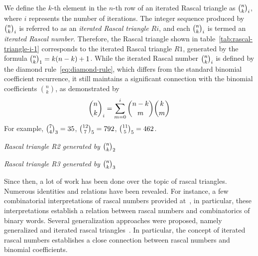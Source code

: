 We define the $k$-th element in the $n$-th row of an iterated Rascal triangle as $\binom{n}{k}_{i}$,
where $i$ represents the number of iterations.
The integer sequence produced by $\binom{n}{k}_{i}$ is referred to as an \textit{iterated Rascal triangle $Ri$},
and each $\binom{n}{k}_{i}$ is termed an \textit{iterated Rascal number}.
Therefore, the Rascal triangle shown in table~\eqref{tab:rascal-triangle-i-1} corresponds
to the iterated Rascal triangle $R1$, generated by the formula $\binom{n}{k}_{1} = k(n-k)+1$.
While the iterated Rascal number $\binom{n}{k}_{i}$ is defined by the diamond rule~\eqref{eq:diamond-rule},
which differs from the standard binomial coefficient recurrence,
it still maintains a significant connection with the binomial coefficients $\binom{n}{k}$,
as demonstrated by
\begin{equation}
    \binom{n}{k}_{i} = \sum_{m=0}^{i} \binom{n-k}{m} \binom{k}{m}
    \label{eq:iterated-rascal-number}
\end{equation}
For example, $\binom{7}{4}_{3}=35$, $\binom{12}{7}_{5}=792$, $\binom{11}{5}_{5}=462$.
\begin{examp}
    \emph{
        Rascal triangle R2 generated by $\binom{n}{k}_{2}$
        }
\end{examp}
\begin{examp}
    \emph{
        Rascal triangle R3 generated by $\binom{n}{k}_{3}$
        }
\end{examp}


Since then, a lot of work has been done over the topic of rascal triangles.
Numerous identities and relations have been revealed.
For instance, a few combinatorial interpretations of rascal numbers provided at~\cite{gibbs2024two}, in particular,
these interpretations establish a relation between rascal numbers and combinatorics of binary words.
Several generalization approaches were proposed, namely generalized
and iterated rascal triangles~\cite{hotchkiss2019generalized,gregory2023iterated_Aequationes}.
In particular, the concept of iterated rascal numbers establishes a close connection between rascal numbers and binomial
coefficients.
